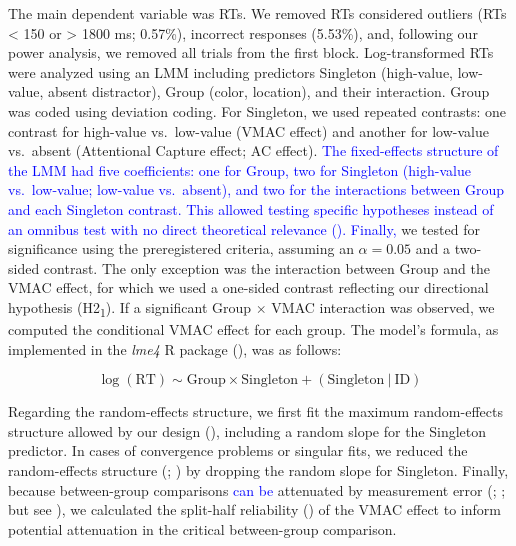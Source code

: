 \documentclass[
  man,
  floatsintext,
  longtable,
  nolmodern,
  notxfonts,
  notimes,
  mask,
  colorlinks=true,linkcolor=blue,citecolor=blue,urlcolor=blue]{apa7}
\begin{document}
The main dependent variable was RTs. We removed RTs considered outliers
(RTs \textless{} 150 or \textgreater{} 1800 ms; 0.57\%), incorrect
responses (5.53\%), and, following our power analysis, we removed all
trials from the first block. Log-transformed RTs were analyzed using an
LMM including predictors Singleton (high-value, low-value, absent
distractor), Group (color, location), and their interaction. Group was
coded using deviation coding. For Singleton, we used repeated contrasts:
one contrast for high-value vs.~low-value (VMAC effect) and another for
low-value vs.~absent (Attentional Capture effect; AC effect).
\textcolor{blue}{The fixed-effects structure of the LMM had five
coefficients: one for Group, two for Singleton (high-value
vs.~low-value; low-value vs.~absent), and two for the interactions
between Group and each Singleton contrast. This allowed testing specific
hypotheses instead of an omnibus test with no direct theoretical
relevance (). Finally,} we
tested for significance using the preregistered criteria, assuming an
\(\alpha = 0.05\) and a two-sided contrast. The only exception was the
interaction between Group and the VMAC effect, for which we used a
one-sided contrast reflecting our directional hypothesis
(H2\textsubscript{1}). If a significant Group \(\times\) VMAC
interaction was observed, we computed the conditional VMAC effect for
each group. The model's formula, as implemented in the \emph{lme4} R
package (), was as
follows:

\[ 
\log(\text{RT}) \sim \text{Group} \times \text{Singleton} + (\text{Singleton} \ | \ \text{ID})
\]

Regarding the random-effects structure, we first fit the maximum
random-effects structure {allowed} by our design
(), including a random slope
for the Singleton predictor. In cases of convergence problems or
singular fits, we reduced the random-effects structure
(;
) by dropping the
random slope for Singleton. Finally, because between-group comparisons
\textcolor{blue}{can be} attenuated by measurement error
(;
; but see
), we calculated the split-half
reliability () of the VMAC
effect to inform potential attenuation in the critical between-group
comparison.
\end{document}

